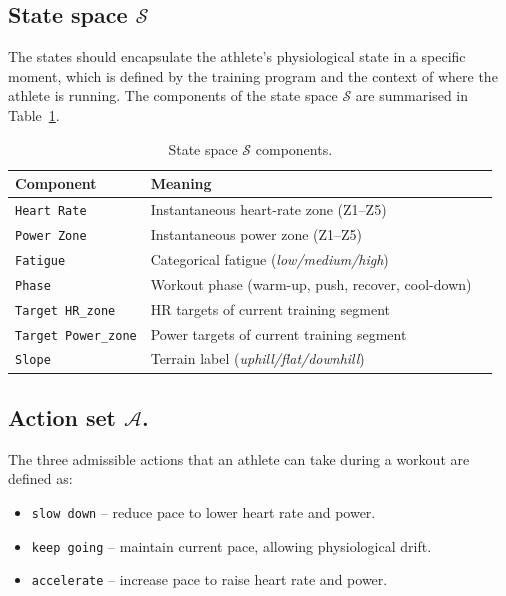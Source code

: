\subsection{State space \(\mathcal{S}\)}\label{subsec:state_space}
The states should encapsulate the athlete's physiological state in a specific moment, which is defined by the training program and the context of where the athlete is running. The components of the state space \(\mathcal{S}\) are summarised in Table~\ref{tab:state_space}.
\begin{table}[H]
\centering
\begin{tabular}{@{}lll@{}}
\toprule
\textbf{Component}        & \textbf{Meaning}                                        \\ \midrule
\verb|Heart Rate|         & Instantaneous heart-rate zone (Z1–Z5)                   \\
\verb|Power Zone|         & Instantaneous power zone (Z1–Z5)                        \\
\verb|Fatigue|            & Categorical fatigue (\emph{low/medium/high})            \\
\verb|Phase|              & Workout phase (warm-up, push, recover, cool-down)       \\
\verb|Target HR_zone|     & HR targets of current training segment                           \\ 
\verb|Target Power_zone|  & Power targets of current training segment                        \\
\verb|Slope|              & Terrain label (\emph{uphill/flat/downhill})             \\ \bottomrule
\end{tabular}
\caption{State space \(\mathcal{S}\) components.}
\label{tab:state_space}
\end{table}

\subsection{Action set \(\mathcal{A}\).}
The three admissible actions that an athlete can take during a workout are defined as:
\begin{itemize}
  \item \texttt{slow down} – reduce pace to lower heart rate and power.
  \item \texttt{keep going} – maintain current pace, allowing physiological drift.
  \item \texttt{accelerate} – increase pace to raise heart rate and power.
\end{itemize}

